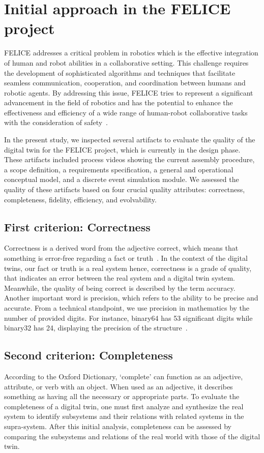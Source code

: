 \documentclass[9pt,conference]{IEEEtran}
\begin{document}
    \section{Initial approach in the FELICE project}
    FELICE addresses a critical problem in robotics which is the effective integration of human and robot abilities in a collaborative setting. This challenge requires the development of sophisticated algorithms and techniques that facilitate seamless communication, 
    cooperation, and coordination between humans and robotic agents. By addressing this issue, FELICE tries to represent a 
    significant advancement in the field of robotics and has the potential to enhance the effectiveness and efficiency of a wide range of human-robot collaborative tasks with the consideration of safety~\cite{FELICE}.

    In the present study, we inspected several artifacts to evaluate the quality of the digital twin for the FELICE project, which is currently in the design phase. These artifacts included process videos showing the current assembly procedure, a scope definition, a requirements specification, a general and operational conceptual model, 
    and a discrete event simulation module. We assessed the quality of these artifacts based on four crucial quality attributes: correctness, completeness, fidelity, efficiency, and evolvability.

    \subsection{First criterion: Correctness}
    Correctness is a  derived word from the adjective correct, which means that something is error-free regarding a fact or truth~\cite{OxfordDictionary}. 
    In the context of the digital twins, our fact or truth is a real system hence, correctness is a grade of quality, that indicates an error between the real system and a digital twin system.
    Meanwhile, the quality of being correct is described by the term accuracy. Another important word is precision, 
    which refers to the ability to be precise and accurate\cite{OxfordDictionary}. 
    From a technical standpoint, we use precision in mathematics by the number of provided digits. 
    For instance, binary64 has 53 significant digits while binary32 has 24, displaying the precision of the structure~\cite{IEE754}.  
    
    \subsection{Second criterion: Completeness}
    According to the Oxford Dictionary, `complete'  can function as an adjective, attribute, or verb with an object\cite{OxfordDictionary}. When used as an adjective, it describes something 
    as having all the necessary or appropriate parts. To evaluate the completeness of a digital twin, 
    one must first analyze and synthesize the real system to identify subsystems and their relations with related systems in the supra-system. 
    After this initial analysis, completeness can be assessed by comparing the subsystems and relations of the real world with those of the digital twin.
\end{document}
